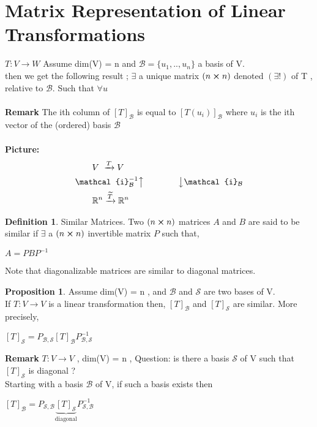 \documentclass[
12pt,
]{article}
\newcommand{\tvw}{T : V\xrightarrow{} W }
\theoremstyle{definition}
\theoremstyle{definition}
\theoremstyle{definition}
\newtheorem{Definition}{Definition}[section]
\theoremstyle{definition}
\newtheorem{Proposition}{Proposition}[section]
\begin{document}
\section{Matrix Representation of Linear Transformations}
$\tvw $ Assume dim(V) = n and $\mathcal{B} = \{u_1,..,u_n \}$ a basis of V.\\
then we get the following result ; $\exists$ a unique matrix $(n\cross n)$ denoted $(\exists !)$ of T , relative to $\mathcal{B}$. Such that $\forall u$ \\ \\
\textbf{Remark} The ith column of $[T]_\mathcal{B}$ is equal to $[T(u_i)]_\mathcal{B}$ where $u_i$ is the ith vector of the (ordered) basis $\mathcal{B}$\\ \\
\textbf{Picture: }
\begin{align*}
    &\quad\quad V \text{  }\xrightarrow{T} V\\
    &\mathcal{i}_\mathcal{B}^{-1}\big\uparrow\quad\quad\quad\quad \big\downarrow\mathcal{i}_\mathcal{B} \\
    &\quad\quad \mathbb{R}^{n} \xrightarrow{\widetilde{T}} \mathbb{R}^{n}
\end{align*}
\begin{Definition}{Similar Matrices.}
Two $(n\cross n)$ matrices $A$ and $B$ are said to be similar if $\exists$ a $(n\cross n)$ invertible matrix $P$ such that,
\begin{center}
    $A=PBP^{-1}$
\end{center}
\end{Definition}
Note that diagonalizable matrices are similar to diagonal matrices.
\begin{Proposition}
    Assume dim(V) = n , and $\mathcal{B}$ and $\mathcal{S}$ are two bases of V.\\
    If $T : V \xrightarrow{} V$ is a linear transformation then, $[T]_\mathcal{B}$ and $[T]_\mathcal{S}$ are similar. More precisely, 
    \begin{center}
        $[T]_\mathcal{S} = P_{\mathcal{B},\mathcal{S}}[T]_\mathcal{B}P_{\mathcal{B},\mathcal{S}}^{-1}$ 
    \end{center}
\end{Proposition}
\textbf{Remark} 
$T : V \xrightarrow{} V $ , dim(V) = n , Question: is there a basis $\mathcal{S}$ of V such that $[T]_\mathcal{S}$ is diagonal ? \\
Starting with a basis $\mathcal{B}$ of V, if such a basis exists then
\begin{center}
    $[T]_\mathcal{B} = P_{\mathcal{S},\mathcal{B}}\underbrace{[T]_\mathcal{S}}_\text{diagonal}P_{\mathcal{S},\mathcal{B}}^{-1}$ 
\end{center}
\end{document}
